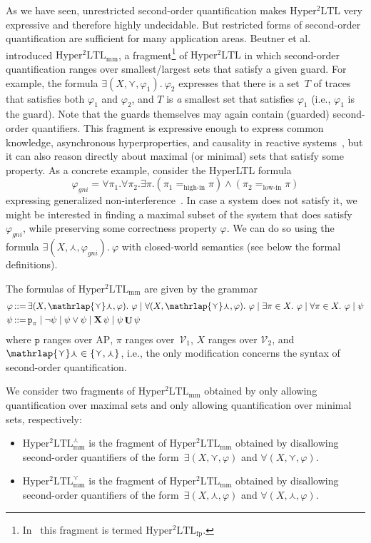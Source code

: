 \documentclass[dvipsnames,10pt,a4paper]{amsart}
\theoremstyle{definition}
\theoremstyle{remark}
\renewcommand{\phi}{\varphi}
\newcommand{\cceq}{\mathop{::=}}
\newcommand{\set}[1]{\{#1\}}
\DeclareMathOperator{\U}{\mathbf{U}}
\newcommand{\X}{\mathop{\mathbf{X}\vphantom{a}}\nolimits}
\newcommand{\sohyltl}{\mathrm{Hyper^2LTL}\xspace}
\newcommand{\sohyltlfp}{\mathrm{Hyper^2LTL_{\mathrm{mm}}}\xspace}
\newcommand{\sohyltlfpmax}{\mathrm{Hyper^2LTL_{\mathrm{mm}}^{\largest}}\xspace}
\newcommand{\sohyltlfpmin}{\mathrm{Hyper^2LTL_{\mathrm{mm}}^{\smallest}}\xspace}
\newcommand{\sohyltlfpold}{\mathrm{Hyper^2LTL_{\mathrm{fp}}}\xspace}
\newcommand{\fovar}{\mathcal{V}_1}
\newcommand{\sovar}{\mathcal{V}_2}
\newcommand{\ap}[0]{\mathrm{AP}}
\newcommand{\smallest}{\curlyvee}
\newcommand{\largest}{\curlywedge}
\newcommand{\smalar}{{\mathrlap{\curlyvee}\curlywedge}}
\newcommand{\proposition}{\texttt{p}}
\newcommand{\gni}{\mathit{gni}}
\begin{document}
As we have seen, unrestricted second-order quantification makes $\sohyltl$ very expressive and therefore highly undecidable. 
But restricted forms of second-order quantification are sufficient for many application areas.
Beutner et al.~\cite{DBLP:conf/cav/BeutnerFFM23} introduced $\sohyltlfp$,
a fragment\footnote{In~\cite{DBLP:conf/cav/BeutnerFFM23} this fragment is termed $\sohyltlfpold$.}  of $\sohyltl$ in which second-order quantification ranges over smallest/largest sets that satisfy a given guard. For example, the formula $\exists (X,\smallest, \phi_1).\ \phi_2$ expresses that there is a set~$T$ of traces that satisfies both $\phi_1$ and $\phi_2$, and $T$ is \emph{a} smallest set that satisfies $\phi_1$ (i.e., $\phi_1$ is the guard). 
Note that the guards themselves may again contain (guarded) second-order quantifiers.
This fragment is expressive enough to express common knowledge, asynchronous hyperproperties, and causality in reactive systems~\cite{DBLP:conf/cav/BeutnerFFM23}, but it can also reason directly about maximal (or minimal) sets that satisfy some property. 
As a concrete example, consider the HyperLTL formula 
\[\varphi_{\gni} = \forall \pi_1. \forall \pi_2. \exists \pi. (\pi_1 =_{\text{high-in}} \pi) \wedge (\pi_2 =_{\text{low-in}} \pi) \] expressing generalized non-interference~\cite{ClarksonFKMRS14}. In case a system does not satisfy it, we might be interested in finding a maximal subset of the system that does satisfy $\varphi_{\gni}$, while preserving some correctness property $\varphi$. We can do so using the formula $\exists (X,\largest, \varphi_{\gni}).\ \phi$  with closed-world semantics (see below the formal definitions). 


The formulas of $\sohyltlfp$ are given by the grammar
\begin{align*}
\phi  {}& \cceq {} \exists (X,\smalar,\phi).\ \phi \mid \forall (X,\smalar,\phi).\ \phi \mid \exists \pi \in X.\ \phi \mid \forall \pi \in X.\ \phi \mid \psi\\
\psi {}&  \cceq {} \proposition_\pi \mid \neg \psi \mid \psi \vee \psi \mid \X \psi \mid \psi \U \psi    
\end{align*}
where $\proposition$ ranges over $\ap$, $\pi$ ranges over~$\fovar$, $X$ ranges over $\sovar$, and $\smalar \in \set{\smallest, \largest}$, i.e., the only modification concerns the syntax of second-order quantification. 

We consider two fragments of $\sohyltlfp$ obtained by only allowing quantification over maximal sets and only allowing quantification over minimal sets, respectively:
\begin{itemize}
    \item $\sohyltlfpmax$ is the fragment of $\sohyltlfp$ obtained by disallowing second-order quantifiers of the form~$\exists (X,\smallest,\phi) $ and $ \forall (X,\smallest,\phi)$.
    \item $\sohyltlfpmin$ is the fragment of $\sohyltlfp$ obtained by disallowing second-order quantifiers of the form~$\exists (X,\largest,\phi) $ and $ \forall (X,\largest,\phi)$.
\end{itemize}
\end{document}
